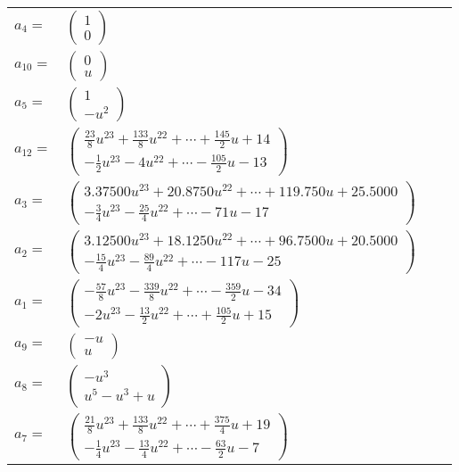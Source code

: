 \documentclass[1p]{elsarticle_modified}
\theoremstyle{definition}
\begin{document}
\begin{tabular}{m{7pt} m{180pt} m{7pt} m{180pt} }
\flushright $a_{4}=$&$\begin{pmatrix}1\\0\end{pmatrix}$ \\
\flushright $a_{10}=$&$\begin{pmatrix}0\\u\end{pmatrix}$ \\
\flushright $a_{5}=$&$\begin{pmatrix}1\\- u^2\end{pmatrix}$ \\
\flushright $a_{12}=$&$\begin{pmatrix}\frac{23}{8} u^{23}+\frac{133}{8} u^{22}+\cdots+\frac{145}{2} u+14\\-\frac{1}{2} u^{23}-4 u^{22}+\cdots-\frac{105}{2} u-13\end{pmatrix}$ \\
\flushright $a_{3}=$&$\begin{pmatrix}3.37500 u^{23}+20.8750 u^{22}+\cdots+119.750 u+25.5000\\-\frac{3}{4} u^{23}-\frac{25}{4} u^{22}+\cdots-71 u-17\end{pmatrix}$ \\
\flushright $a_{2}=$&$\begin{pmatrix}3.12500 u^{23}+18.1250 u^{22}+\cdots+96.7500 u+20.5000\\-\frac{15}{4} u^{23}-\frac{89}{4} u^{22}+\cdots-117 u-25\end{pmatrix}$ \\
\flushright $a_{1}=$&$\begin{pmatrix}-\frac{57}{8} u^{23}-\frac{339}{8} u^{22}+\cdots-\frac{359}{2} u-34\\-2 u^{23}-\frac{13}{2} u^{22}+\cdots+\frac{105}{2} u+15\end{pmatrix}$ \\
\flushright $a_{9}=$&$\begin{pmatrix}- u\\u\end{pmatrix}$ \\
\flushright $a_{8}=$&$\begin{pmatrix}- u^3\\u^5- u^3+u\end{pmatrix}$ \\
\flushright $a_{7}=$&$\begin{pmatrix}\frac{21}{8} u^{23}+\frac{133}{8} u^{22}+\cdots+\frac{375}{4} u+19\\-\frac{1}{4} u^{23}-\frac{13}{4} u^{22}+\cdots-\frac{63}{2} u-7\end{pmatrix}$ \\

\end{tabular}
\end{document}
